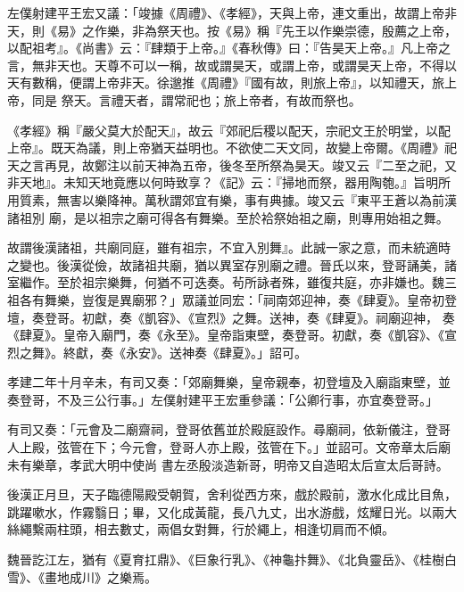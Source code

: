 \begin{pinyinscope}
 左僕射建平王宏又議：「竣據《周禮》、《孝經》，天與上帝，連文重出，故謂上帝非天，則《易》之作樂，非為祭天也。按《易》稱『先王以作樂崇德，殷薦之上帝，以配祖考』。《尚書》云：『肆類于上帝。』《春秋傳》曰：『告昊天上帝。』凡上帝之言，無非天也。天尊不可以一稱，故或謂昊天，或謂上帝，或謂昊天上帝，不得以天有數稱，便謂上帝非天。徐邈推《周禮》『國有故，則旅上帝』，以知禮天，旅上帝，同是
 祭天。言禮天者，謂常祀也；旅上帝者，有故而祭也。



 《孝經》稱『嚴父莫大於配天』，故云『郊祀后稷以配天，宗祀文王於明堂，以配上帝』。既天為議，則上帝猶天益明也。不欲使二天文同，故變上帝爾。《周禮》祀天之言再見，故鄭注以前天神為五帝，後冬至所祭為昊天。竣又云『二至之祀，又非天地』。未知天地竟應以何時致享？《記》云：『掃地而祭，器用陶匏。』旨明所用質素，無害以樂降神。萬秋謂郊宜有樂，事有典據。竣又云『東平王蒼以為前漢諸祖別
 廟，是以祖宗之廟可得各有舞樂。至於袷祭始祖之廟，則專用始祖之舞。



 故謂後漢諸祖，共廟同庭，雖有祖宗，不宜入別舞』。此誠一家之意，而未統適時之變也。後漢從儉，故諸祖共廟，猶以異室存別廟之禮。晉氏以來，登哥誦美，諸室繼作。至於祖宗樂舞，何猶不可迭奏。茍所詠者殊，雖復共庭，亦非嫌也。魏三祖各有舞樂，豈復是異廟邪？」眾議並同宏：「祠南郊迎神，奏《肆夏》。皇帝初登壇，奏登哥。初獻，奏《凱容》、《宣烈》之舞。送神，奏《肆夏》。祠廟迎神，
 奏《肆夏》。皇帝入廟門，奏《永至》。皇帝詣東壁，奏登哥。初獻，奏《凱容》、《宣烈之舞》。終獻，奏《永安》。送神奏《肆夏》。」詔可。



 孝建二年十月辛未，有司又奏：「郊廟舞樂，皇帝親奉，初登壇及入廟詣東壁，並奏登哥，不及三公行事。」左僕射建平王宏重參議：「公卿行事，亦宜奏登哥。」



 有司又奏：「元會及二廟齋祠，登哥依舊並於殿庭設作。尋廟祠，依新儀注，登哥人上殿，弦管在下；今元會，登哥人亦上殿，弦管在下。」並詔可。文帝章太后廟未有樂章，孝武大明中使尚
 書左丞殷淡造新哥，明帝又自造昭太后宣太后哥詩。



 後漢正月旦，天子臨德陽殿受朝賀，舍利從西方來，戲於殿前，激水化成比目魚，跳躍嗽水，作霧翳日；畢，又化成黃龍，長八九丈，出水游戲，炫耀日光。以兩大絲繩繫兩柱頭，相去數丈，兩倡女對舞，行於繩上，相逢切肩而不傾。



 魏晉訖江左，猶有《夏育扛鼎》、《巨象行乳》、《神龜抃舞》、《北負靈岳》、《桂樹白雪》、《畫地成川》之樂焉。




\end{pinyinscope}
